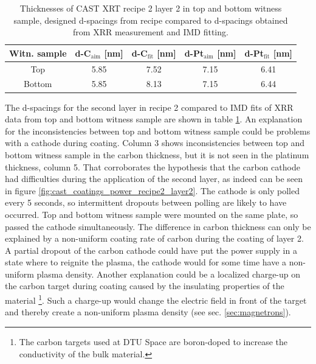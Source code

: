 \begin{table}
  \centering
\begin{tabular}{c|c|c|c|c}
Witn. sample& d-C$_{\text{aim}}$ [nm]&d-C$_{\text{fit}}$ [nm]&d-Pt$_{\text{aim}}$ [nm]&d-Pt$_{\text{fit}}$ [nm]\\
\hline
Top&5.85&7.52&7.15&6.41\\
Bottom&5.85&8.13&7.15&6.44\\
\end{tabular}
\caption{\footnotesize Thicknesses of CAST XRT recipe 2 layer 2 in top and bottom witness sample, designed d-spacings from recipe compared to d-spacings obtained from XRR measurement and IMD fitting.}\label{tab:recipe2layer2}
\end{table}

The d-spacings for the second layer in recipe 2 compared to IMD fits of XRR data from top and bottom witness sample are shown in table \ref{tab:recipe2layer2}. An explanation for the inconsistencies between top and bottom witness sample could be problems with a cathode during coating. Column 3 shows inconsistencies between top and bottom witness sample in the carbon thickness, but it is not seen in the platinum thickness, column 5. That corroborates the hypothesis that the carbon cathode had difficulties during the application of the second layer, as indeed can be seen in figure \ref{fig:cast_coatings_power_recipe2_layer2}. The cathode is only polled every 5 seconds, so intermittent dropouts between polling are likely to have occurred. Top and bottom witness sample were mounted on the same plate, so passed the cathode simultaneously. The difference in carbon thickness can only be explained by a non-uniform coating rate of carbon during the coating of layer 2. A partial dropout of the carbon cathode could have put the power supply in a state where to reignite the plasma, the cathode would for some time have a non-uniform plasma density. Another explanation could be a localized charge-up on the carbon target during coating caused by the insulating properties of the material \footnote{The carbon targets used at DTU Space are boron-doped to increase the conductivity of the bulk material.}. Such a charge-up would change the electric field in front of the target and thereby create a non-uniform plasma density (see sec. \ref{sec:magnetrons}).

